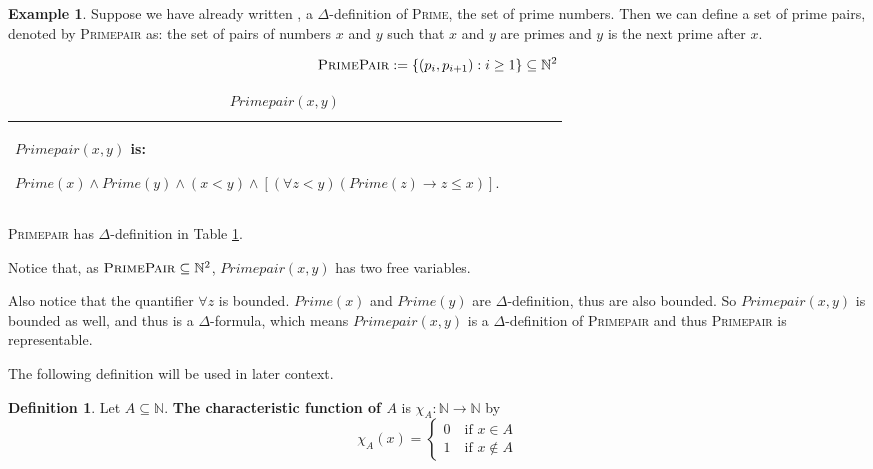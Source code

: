 \documentclass[11pt,letterpaper]{book}
\theoremstyle{definition}
\newtheorem{definition}{Definition}[section]
\newtheorem{example}{Example}[section]
\begin{document}
\begin{example}
Suppose we have already written , a $\Delta$-definition
of \textsc{Prime}, the set of prime numbers. Then we can define a set of
prime pairs, denoted by \textsc{Primepair} as: the set of pairs of numbers $x$ and $y$ such that $x$ and
$y$ are primes and $y$ is the next prime after $x$.

$$\text{\textsc{PrimePair}} := \{ (p_i , p_{i+1}) : i \geq 1 \} \subseteq \mathbb{N}^2  $$

\begin{table}[h]
\caption{$ Primepair(x, y) $}
\begin{tabular}{|p{0.9\linewidth}|}
\hline
\rule{0pt}{3ex}
$ Primepair(x, y) $ is:
\begin{center}
$ Prime(x) \land Prime(y) \land (x < y ) \land [ (\forall z < y) (Prime(z) \rightarrow
z \leq x ) ] .$
\end{center} \\
\hline
\end{tabular}
\label{box:primepair}
\end{table}

\textsc{Primepair} has $\Delta$-definition in Table \ref{box:primepair}.

Notice that, as $\text{\textsc{PrimePair}}  \subseteq \mathbb{N}^2  $, $Primepair(x, y)$ has two free variables.

Also notice that the quantifier $\forall z$ is bounded. $Prime(x)$ and $Prime(y)$ are $\Delta$-definition, thus are also bounded. So $ Primepair(x, y) $ is bounded as well, and thus is a $\Delta$-formula, which means $Primepair(x, y)$ is a $\Delta$-definition of \textsc{Primepair} and thus \textsc{Primepair} is representable.

\end{example}

The following definition will be used in later context.

\begin{definition}\label{def:characteristic_func}
Let $A \subseteq \mathbb{N}$. \textbf{The characteristic function of
$A$} is $\chi_{A} : \mathbb{N} \rightarrow \mathbb{N}$ by
\begin{equation}
\chi_A (x) =
\begin{cases}
0 \quad \text{if } x \in A \\
1 \quad \text{if } x \not \in A
\end{cases}
\nonumber
\end{equation}
\end{definition}
\end{document}

